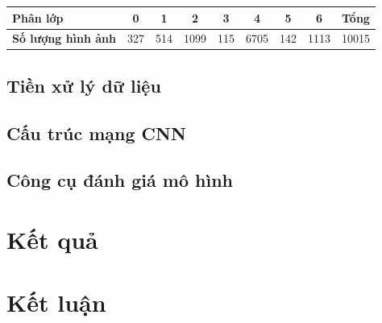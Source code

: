 \documentclass[12pt,a4paper]{article}
\begin{document}
	\begin{center}
		\begin{tabular}{|l|c|c|c|c|c|c|c|l|}
			\hline
			\rowcolor[HTML]{000000} 
			{\color[HTML]{FFFFFF} \textbf{Phân lớp}} & {\color[HTML]{FFFFFF} \textbf{0}} & {\color[HTML]{FFFFFF} \textbf{1}} & {\color[HTML]{FFFFFF} \textbf{2}} & {\color[HTML]{FFFFFF} \textbf{3}} & {\color[HTML]{FFFFFF} \textbf{4}} & {\color[HTML]{FFFFFF} \textbf{5}} & {\color[HTML]{FFFFFF} \textbf{6}} & {\color[HTML]{FFFFFF} \textbf{Tổng}} \\ \hline
			\textbf{Số lượng hình ảnh}               & 327                               & 514                               & 1099                              & 115                               & 6705                              & 142                               & 1113                              & 10015                                \\ \hline
		\end{tabular}
	\end{center}
	
	
	
	\subsection{Tiền xử lý dữ liệu}
	
	\subsection{Cấu trúc mạng CNN}
	
	\subsection{Công cụ đánh giá mô hình}
	
	
	\section{Kết quả}
	
	
	\section{Kết luận}
\end{document}
